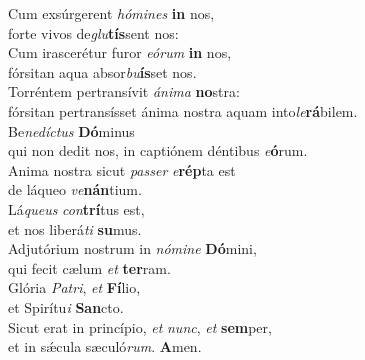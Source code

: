 \evenverse Cum exsúrgerent \textit{hó}\textit{mi}\textit{nes} \textbf{in} nos,~\*\\
\evenverse forte vivos de\textit{glu}\textbf{tís}sent nos:\\
\oddverse Cum irascerétur furor \textit{e}\textit{ó}\textit{rum} \textbf{in} nos,~\*\\
\oddverse fórsitan aqua absor\textit{bu}\textbf{ís}set nos.\\
\evenverse Torréntem pertransívit \textit{á}\textit{ni}\textit{ma} \textbf{no}stra:~\*\\
\evenverse fórsitan pertransísset ánima nostra aquam into\textit{le}\textbf{rá}bilem.\\
\oddverse Be\textit{ne}\textit{dí}\textit{ctus} \textbf{Dó}minus~\*\\
\oddverse qui non dedit nos, in captiónem déntibus \textit{e}\textbf{ó}rum.\\
\evenverse Anima nostra sicut \textit{pas}\textit{ser} \textit{e}\textbf{rép}ta est~\*\\
\evenverse de láqueo \textit{ve}\textbf{nán}tium.\\
\oddverse Lá\textit{que}\textit{us} \textit{con}\textbf{trí}tus est,~\*\\
\oddverse et nos liberá\textit{ti} \textbf{su}mus.\\
\evenverse Adjutórium nostrum in \textit{nó}\textit{mi}\textit{ne} \textbf{Dó}mini,~\*\\
\evenverse qui fecit cælum \textit{et} \textbf{ter}ram.\\
\oddverse Glória \textit{Pa}\textit{tri}, \textit{et} \textbf{Fí}lio,~\*\\
\oddverse et Spirítu\textit{i} \textbf{San}cto.\\
\evenverse Sicut erat in princípio, \textit{et} \textit{nunc}, \textit{et} \textbf{sem}per,~\*\\
\evenverse et in sǽcula sæculó\textit{rum}. \textbf{A}men.\\
